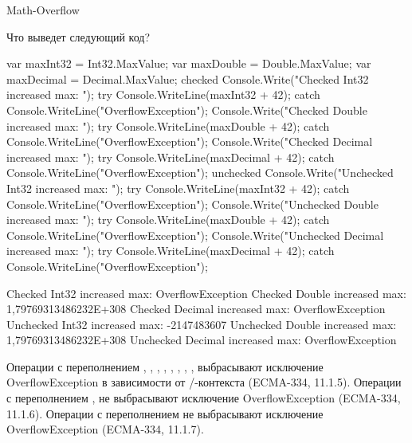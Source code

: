 \begin{defproblem}{Math-Overflow}
\begin{onlyproblem}
  Что выведет следующий код?
  \begin{source}
  var maxInt32 = Int32.MaxValue;
  var maxDouble = Double.MaxValue;
  var maxDecimal = Decimal.MaxValue;
  checked
  {
    Console.Write("Checked   Int32   increased max: ");
    try { Console.WriteLine(maxInt32 + 42); }
    catch { Console.WriteLine("OverflowException"); }
    Console.Write("Checked   Double  increased max: ");
    try { Console.WriteLine(maxDouble + 42); }
    catch { Console.WriteLine("OverflowException"); }
    Console.Write("Checked   Decimal increased max: ");
    try { Console.WriteLine(maxDecimal + 42); }
    catch { Console.WriteLine("OverflowException"); }
  }
  unchecked
  {
    Console.Write("Unchecked Int32   increased max: ");
    try { Console.WriteLine(maxInt32 + 42); }
    catch { Console.WriteLine("OverflowException"); }
    Console.Write("Unchecked Double  increased max: ");
    try { Console.WriteLine(maxDouble + 42); }
    catch { Console.WriteLine("OverflowException"); }
    Console.Write("Unchecked Decimal increased max: ");
    try { Console.WriteLine(maxDecimal + 42); }
    catch { Console.WriteLine("OverflowException"); }
  }
  \end{source}
\end{onlyproblem}
\begin{onlysolution}
  \begin{source}
  Checked   Int32   increased max: OverflowException
  Checked   Double  increased max: 1,79769313486232E+308
  Checked   Decimal increased max: OverflowException
  Unchecked Int32   increased max: -2147483607
  Unchecked Double  increased max: 1,79769313486232E+308
  Unchecked Decimal increased max: OverflowException
  \end{source}
  Операции с переполнением , , , , , , , ,  выбрасывают исключение OverflowException в зависимости от /-контекста (ECMA-334, 11.1.5).
  Операции с переполнением ,  не выбрасывают исключение OverflowException (ECMA-334, 11.1.6).
  Операции с переполнением  не выбрасывают исключение OverflowException (ECMA-334, 11.1.7).
\end{onlysolution}
\end{defproblem}
